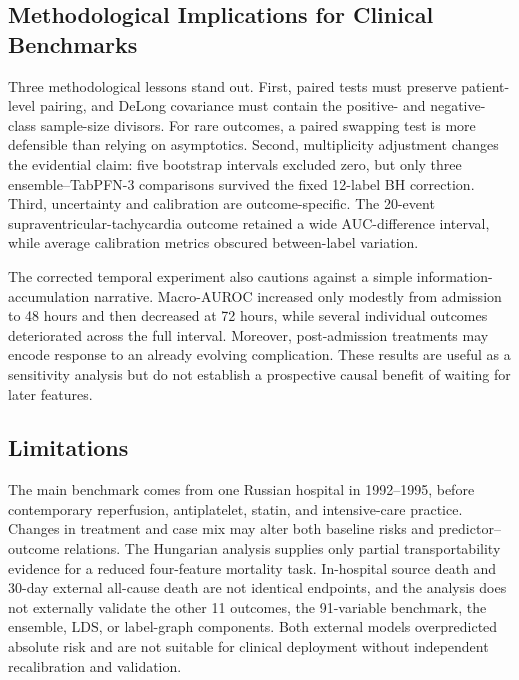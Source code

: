 \documentclass{ieeeaccess}
\begin{document}
\subsection{Methodological Implications for Clinical Benchmarks}

Three methodological lessons stand out. First, paired tests must preserve patient-level pairing, and DeLong covariance must contain the positive- and negative-class sample-size divisors. For rare outcomes, a paired swapping test is more defensible than relying on asymptotics. Second, multiplicity adjustment changes the evidential claim: five bootstrap intervals excluded zero, but only three ensemble--TabPFN-3 comparisons survived the fixed 12-label BH correction. Third, uncertainty and calibration are outcome-specific. The 20-event supraventricular-tachycardia outcome retained a wide AUC-difference interval, while average calibration metrics obscured between-label variation.

The corrected temporal experiment also cautions against a simple information-accumulation narrative. Macro-AUROC increased only modestly from admission to 48 hours and then decreased at 72 hours, while several individual outcomes deteriorated across the full interval. Moreover, post-admission treatments may encode response to an already evolving complication. These results are useful as a sensitivity analysis but do not establish a prospective causal benefit of waiting for later features.

\subsection{Limitations}

The main benchmark comes from one Russian hospital in 1992--1995, before contemporary reperfusion, antiplatelet, statin, and intensive-care practice. Changes in treatment and case mix may alter both baseline risks and predictor--outcome relations. The Hungarian analysis supplies only partial transportability evidence for a reduced four-feature mortality task. In-hospital source death and 30-day external all-cause death are not identical endpoints, and the analysis does not externally validate the other 11 outcomes, the 91-variable benchmark, the ensemble, $\mathrm{LDS}$, or label-graph components. Both external models overpredicted absolute risk and are not suitable for clinical deployment without independent recalibration and validation.
\end{document}
